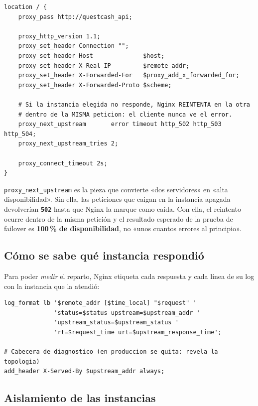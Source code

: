 \documentclass[11pt,letterpaper]{article}
\newcommand{\http}[2]{\textcolor{#1}{\texttt{\textbf{#2}}}}
\begin{document}
\begin{lstlisting}[style=conf,language=nginxconf,caption={\texttt{nginx.conf} — bloque \texttt{location} principal.}]
location / {
    proxy_pass http://questcash_api;

    proxy_http_version 1.1;
    proxy_set_header Connection "";
    proxy_set_header Host              $host;
    proxy_set_header X-Real-IP         $remote_addr;
    proxy_set_header X-Forwarded-For   $proxy_add_x_forwarded_for;
    proxy_set_header X-Forwarded-Proto $scheme;

    # Si la instancia elegida no responde, Nginx REINTENTA en la otra
    # dentro de la MISMA peticion: el cliente nunca ve el error.
    proxy_next_upstream       error timeout http_502 http_503 http_504;
    proxy_next_upstream_tries 2;

    proxy_connect_timeout 2s;
}
\end{lstlisting}

\begin{nota}
\texttt{proxy\_next\_upstream} es la pieza que convierte «dos servidores» en
«alta disponibilidad». Sin ella, las peticiones que caigan en la instancia
apagada devolverían \http{qcRed}{502} hasta que Nginx la marque como caída. Con
ella, el reintento ocurre dentro de la misma petición y el resultado esperado de
la prueba de failover es \textbf{100\,\% de disponibilidad}, no «unos cuantos
errores al principio».
\end{nota}

\subsection{Cómo se sabe qué instancia respondió}

Para poder \emph{medir} el reparto, Nginx etiqueta cada respuesta y cada línea
de su log con la instancia que la atendió:

\begin{lstlisting}[style=conf,language=nginxconf,caption={\texttt{nginx.conf} — instrumentación para la evidencia.}]
log_format lb '$remote_addr [$time_local] "$request" '
              'status=$status upstream=$upstream_addr '
              'upstream_status=$upstream_status '
              'rt=$request_time urt=$upstream_response_time';

# Cabecera de diagnostico (en produccion se quita: revela la topologia)
add_header X-Served-By $upstream_addr always;
\end{lstlisting}

\subsection{Aislamiento de las instancias}
\end{document}

